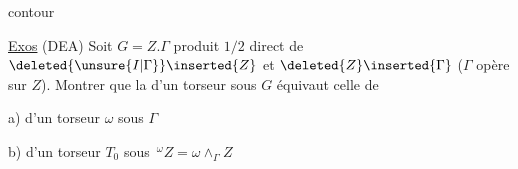 contour

\uline{Exos} (DEA) Soit $G=Z.\Gamma$ produit $1/2$ direct de $\deleted{\unsure{I|\Gamma}}\inserted{Z}$ et $\deleted{Z}\inserted{\Gamma}$ ($\Gamma$ opère sur $Z$). Montrer que la  d'un torseur  sous $G$ équivaut  celle de

a) d'un torseur $\omega$ sous $\Gamma$

b) d'un torseur $T_0$ sous $\,{}^\omega Z=\omega\wedge_\Gamma Z$

